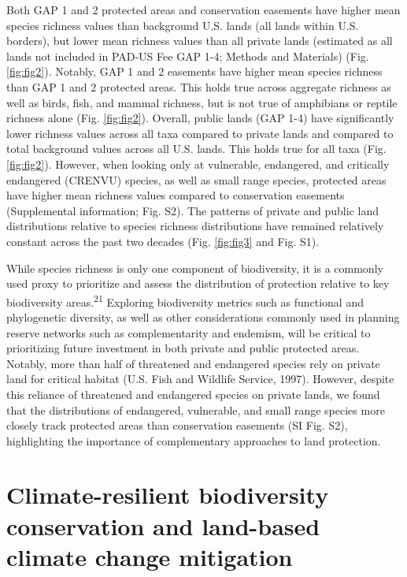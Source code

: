\documentclass[3p]{elsarticle} %
\begin{document}
Both GAP 1 and 2 protected areas and conservation easements have higher
mean species richness values than background U.S. lands (all lands
within U.S. borders), but lower mean richness values than all private
lands (estimated as all lands not included in PAD-US Fee GAP 1-4;
Methods and Materials) (Fig. \ref{fig:fig2}). Notably, GAP 1 and 2
easements have higher mean species richness than GAP 1 and 2 protected
areas. This holds true across aggregate richness as well as birds, fish,
and mammal richness, but is not true of amphibians or reptile richness
alone (Fig. \ref{fig:fig2}). Overall, public lands (GAP 1-4) have
significantly lower richness values across all taxa compared to private
lands and compared to total background values across all U.S. lands.
This holds true for all taxa (Fig. \ref{fig:fig2}). However, when
looking only at vulnerable, endangered, and critically endangered
(CRENVU) species, as well as small range species, protected areas have
higher mean richness values compared to conservation easements
(Supplemental information; Fig. S2). The patterns of private and public
land distributions relative to species richness distributions have
remained relatively constant across the past two decades (Fig.
\ref{fig:fig3} and Fig. S1).

While species richness is only one component of biodiversity, it is a
commonly used proxy to prioritize and assess the distribution of
protection relative to key biodiversity areas.\textsuperscript{21}
Exploring biodiversity metrics such as functional and phylogenetic
diversity, as well as other considerations commonly used in planning
reserve networks such as complementarity and endemism, will be critical
to prioritizing future investment in both private and public protected
areas. Notably, more than half of threatened and endangered species rely
on private land for critical habitat (U.S. Fish and Wildlife Service,
1997). However, despite this reliance of threatened and endangered
species on private lands, we found that the distributions of endangered,
vulnerable, and small range species more closely track protected areas
than conservation easements (SI Fig. S2), highlighting the importance of
complementary approaches to land protection.

\hypertarget{climate-resilient-biodiversity-conservation-and-land-based-climate-change-mitigation}{%
\section{Climate-resilient biodiversity conservation and land-based
climate change
mitigation}\label{climate-resilient-biodiversity-conservation-and-land-based-climate-change-mitigation}}
\end{document}
